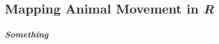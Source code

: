 \documentclass[b5paper]{scrbook}
\begin{document}
	
	\tableofcontents
	
	\begin{addmargin}[-1cm]{-2cm}
		
		\colorbox{Snow2}{
			\begin{minipage}[t]{\linewidth}%
					\chapter*{Mapping Animal Movement in \textit{R}}
					
					\paragraph{Something}
					\lipsum[1]
			\end{minipage}
		}
		
	\end{addmargin}
\end{document}
